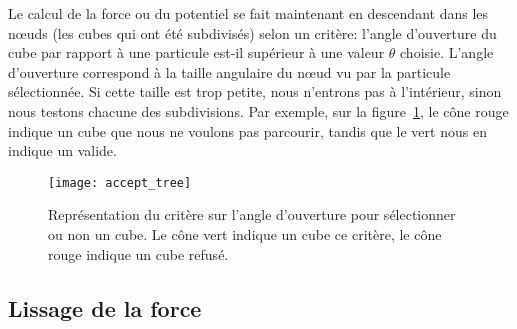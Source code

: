 			Le calcul de la force ou du potentiel se fait maintenant en descendant dans les nœuds (les cubes
			qui ont été subdivisés) selon un critère: l'angle d'ouverture du cube par rapport à une
			particule est-il supérieur à une valeur $\theta$ choisie.
			L'angle d'ouverture correspond à la taille angulaire du nœud vu par la particule sélectionnée.
			Si cette taille est trop petite, nous n'entrons pas à l'intérieur, sinon nous testons chacune des
			subdivisions. Par exemple, sur la figure~\ref{Fig::KDTree::Parcours}, le cône rouge indique un
			cube que nous ne voulons pas parcourir, tandis que le vert nous en indique un valide.

			\begin{figure}
				\begin{center}
					\texttt{[image: accept\_tree]}
					\caption{\label{Fig::KDTree::Parcours}Représentation du critère sur l'angle
					d'ouverture pour sélectionner ou non un cube. Le cône vert indique un cube ce
					critère, le cône rouge indique un cube refusé.}
				\end{center}
			\end{figure}

		\subsection{Lissage de la force}



